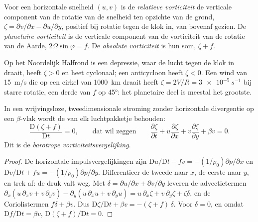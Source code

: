 \begin{definition}\label{def:b3:atmospheric-dynamics:vorticity-kinds}
Voor een horizontale snelheid $(u, v)$ is de \emph{relatieve
vorticiteit} de verticale component van de rotatie
van de snelheid ten opzichte van de grond, $\zeta = \partial v/\partial x -
\partial u/\partial y$, positief bij rotatie tegen de klok in, van bovenaf gezien.
De \emph{planetaire vorticiteit} is de verticale
component van de vorticiteit van de rotatie van de Aarde, $2\Omega\sin\varphi =
f$. De \emph{absolute vorticiteit} is hun som,
$\zeta + f$.
\end{definition}

Op het Noordelijk Halfrond is een depressie, waar de lucht tegen de klok in draait,
heeft $\zeta > 0$ en heet cyclonaal; een anticycloon heeft $\zeta < 0$. Een
wind van \qty{15}{m/s} die op een cirkel van \qty{1000}{km} draait heeft $\zeta =
2V/R = \qty{3e-5}{s^{-1}}$ bij starre rotatie, een derde van $f$ op \ang{45}:
het planetaire deel is meestal het grootste.

\begin{theorem}\label{thm:b3:atmospheric-dynamics:bve}
In een wrijvingsloze, tweedimensionale stroming zonder horizontale divergentie op een
$\beta$-vlak wordt de  van elk luchtpakketje behouden:
\[
\frac{\mathrm D(\zeta + f)}{\mathrm Dt} = 0 ,
\qquad\text{dat wil zeggen}\qquad
\frac{\partial\zeta}{\partial t} + u\frac{\partial\zeta}{\partial x} + v\frac{\partial\zeta}{\partial y} + \beta v = 0 .
\]
Dit is de \emph{barotrope vorticiteitsvergelijking}.
\end{theorem}

\begin{proof}
De horizontale impulsvergelijkingen zijn $\mathrm Du/\mathrm Dt - fv =
-(1/\rho_0)\partial p/\partial x$ en $\mathrm Dv/\mathrm Dt + fu =
-(1/\rho_0)\partial p/\partial y$. Differentieer de tweede naar
$x$, de eerste naar $y$, en trek af: de druk valt weg.
Met $\delta = \partial u/\partial x + \partial v/\partial y$ leveren de
advectietermen $\partial_x(u\,\partial_xv + v\,\partial_yv) -
\partial_y(u\,\partial_xu + v\,\partial_yu) = u\,\partial_x\zeta +
v\,\partial_y\zeta + \zeta\delta$, en de Coriolistermen $f\delta + \beta
v$. Dus $\mathrm D\zeta/\mathrm Dt + \beta v = -(\zeta + f)\,\delta$. Voor
$\delta = 0$, en omdat $\mathrm Df/\mathrm Dt = \beta v$, $\mathrm D(\zeta +
f)/\mathrm Dt = 0$.
\end{proof}

